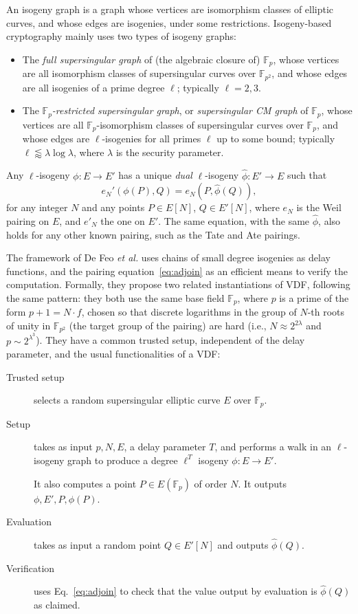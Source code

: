 \documentclass{llncs}
\newcommand{\F}{\mathbb{F}}
\begin{document}
An isogeny graph is a graph whose vertices are isomorphism classes of
elliptic curves, and whose edges are isogenies, under some
restrictions. %
Isogeny-based cryptography mainly uses two types of isogeny graphs:
\begin{itemize}
\item The \emph{full supersingular graph} of (the algebraic closure of)
  $\F_p$, whose vertices
  are all isomorphism classes of supersingular curves over $\F_{p^2}$,
  and whose edges are all isogenies of a prime degree $\ell$;
  typically $\ell=2,3$.
\item The \emph{$\F_p$-restricted supersingular graph}, or
  \emph{supersingular CM graph} of $\F_p$, whose vertices are all
  $\F_p$-isomorphism classes of supersingular curves over $\F_p$, and
  whose edges are $\ell$-isogenies for all primes $\ell$ up to some
  bound; typically $\ell\lessapprox\lambda\log\lambda$, where
  $\lambda$ is the security parameter.
\end{itemize}

Any $\ell$-isogeny $\phi:E\to E'$ has a unique \emph{dual}
$\ell$-isogeny $\hat\phi:E'\to E$ such that
\begin{equation}
  \label{eq:adjoin}
  e_N'(\phi(P),Q) = e_N(P,\hat\phi(Q)),
\end{equation}
for any integer $N$ and any points $P\in E[N]$, $Q\in E'[N]$, where
$e_N$ is the Weil pairing on $E$, and $e'_N$ the one on $E'$. %
The same equation, with the same $\hat\phi$, also holds for any other
known pairing, such as the Tate and Ate pairings.

The framework of De Feo \emph{et al.} uses chains of small degree
isogenies as delay functions, and the pairing
equation~\eqref{eq:adjoin} as an efficient means to verify the
computation. %
Formally, they propose two related instantiations of VDF, following
the same pattern: they both use the same base field $\F_p$, where $p$
is a prime of the form $p+1=N\cdot f$, chosen so that discrete
logarithms in the group of $N$-th roots of unity in $\F_{p^2}$ (the
target group of the pairing) are hard (i.e., $N\approx 2^{2\lambda}$
and $p\sim 2^{\lambda^3}$). %
They have a common trusted setup, independent of the delay parameter,
and the usual functionalities of a VDF:
\begin{description}
\item[Trusted setup] selects a random supersingular elliptic curve $E$
  over $\F_p$.
\item[Setup] takes as input $p,N,E$, a delay parameter $T$, and
  performs a walk in an $\ell$-isogeny graph to produce a degree
  $\ell^T$ isogeny $\phi:E\to E'$.
  
  It also computes a point $P\in E(\F_p)$ of order $N$. %
  It  outputs $\phi,E',P,\phi(P)$.
\item[Evaluation] takes as input a random point $Q\in E'[N]$ and outputs
  $\hat\phi(Q)$.
\item[Verification] uses Eq.~\eqref{eq:adjoin} to check that the value
  output by evaluation is $\hat\phi(Q)$ as claimed.
\end{description}
\end{document}
